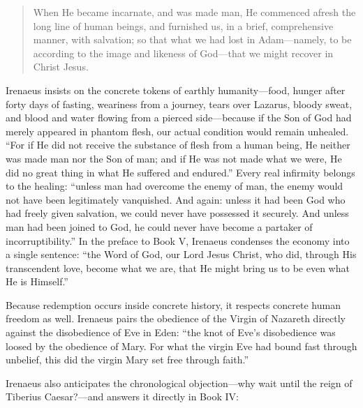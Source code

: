 \begin{quote}
When He became incarnate, and was made man, He commenced afresh the long line of human beings, and furnished us, in a brief, comprehensive manner, with salvation; so that what we had lost in Adam---namely, to be according to the image and likeness of God---that we might recover in Christ Jesus.
\end{quote}

Irenaeus insists on the concrete tokens of earthly humanity---food, hunger after forty days of fasting, weariness from a journey, tears over Lazarus, bloody sweat, and blood and water flowing from a pierced side---because if the Son of God had merely appeared in phantom flesh, our actual condition would remain unhealed. ``For if He did not receive the substance of flesh from a human being, He neither was made man nor the Son of man; and if He was not made what we were, He did no great thing in what He suffered and endured.'' Every real infirmity belongs to the healing: ``unless man had overcome the enemy of man, the enemy would not have been legitimately vanquished. And again: unless it had been God who had freely given salvation, we could never have possessed it securely. And unless man had been joined to God, he could never have become a partaker of incorruptibility.'' In the preface to Book V, Irenaeus condenses the economy into a single sentence: ``the Word of God, our Lord Jesus Christ, who did, through His transcendent love, become what we are, that He might bring us to be even what He is Himself.''

Because redemption occurs inside concrete history, it respects concrete human freedom as well. Irenaeus pairs the obedience of the Virgin of Nazareth directly against the disobedience of Eve in Eden: ``the knot of Eve's disobedience was loosed by the obedience of Mary. For what the virgin Eve had bound fast through unbelief, this did the virgin Mary set free through faith.''

Irenaeus also anticipates the chronological objection---why wait until the reign of Tiberius Caesar?---and answers it directly in Book IV:

